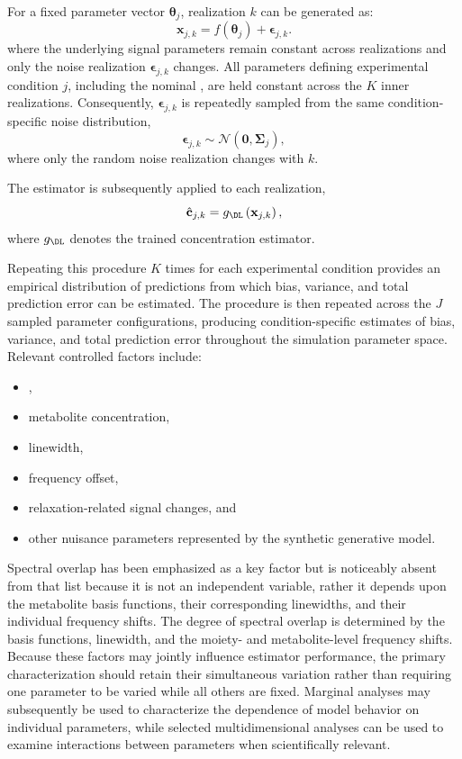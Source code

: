 For a fixed parameter vector $\boldsymbol{\theta}_j$, realization $k$ can be generated as:
\begin{equation}
    \mathbf{x}_{j,k} = f\left(\boldsymbol{\theta}_{j}\right) + \boldsymbol{\epsilon}_{j,k}.
\end{equation}
where the underlying signal parameters remain constant across realizations and only the noise realization $\boldsymbol{\epsilon}_{j,k}$ changes. All parameters defining experimental condition $j$, including the nominal \SNR, are held constant across the $K$ inner realizations. Consequently, $\boldsymbol{\epsilon}_{j,k}$ is repeatedly sampled from the same condition-specific noise distribution,
\begin{equation}
    \boldsymbol{\epsilon}_{j,k} \sim \mathcal{N}\left(\mathbf{0},\boldsymbol{\Sigma}_j\right),
\end{equation}
where only the random noise realization changes with $k$.

The \DL estimator is subsequently applied to each realization,
\begin{equation}
    \hat{\mathbf{c}}_{j,k} = g_{\DL}\left(\mathbf{x}_{j,k}\right),
\end{equation}
where $g_{\DL}$ denotes the trained concentration estimator.

Repeating this procedure $K$ times for each experimental condition provides an empirical distribution of predictions from which bias, variance, and total prediction error can be estimated. The procedure is then repeated across the $J$ sampled parameter configurations, producing condition-specific estimates of bias, variance, and total prediction error throughout the simulation parameter space. Relevant controlled factors include:
\begin{itemize}
    \item \SNR,
    \item metabolite concentration,
    \item linewidth,
    \item frequency offset,
    \item relaxation-related signal changes, and
    \item other nuisance parameters represented by the synthetic generative model.
\end{itemize}
Spectral overlap has been emphasized as a key factor but is noticeably absent from that list because it is not an independent variable, rather it depends upon the metabolite basis functions, their corresponding linewidths, and their individual frequency shifts. The degree of spectral overlap is determined by the basis functions, linewidth, and the moiety- and metabolite-level frequency shifts. Because these factors may jointly influence estimator performance, the primary characterization should retain their simultaneous variation rather than requiring one parameter to be varied while all others are fixed. Marginal analyses may subsequently be used to characterize the dependence of model behavior on individual parameters, while selected multidimensional analyses can be used to examine interactions between parameters when scientifically relevant.

